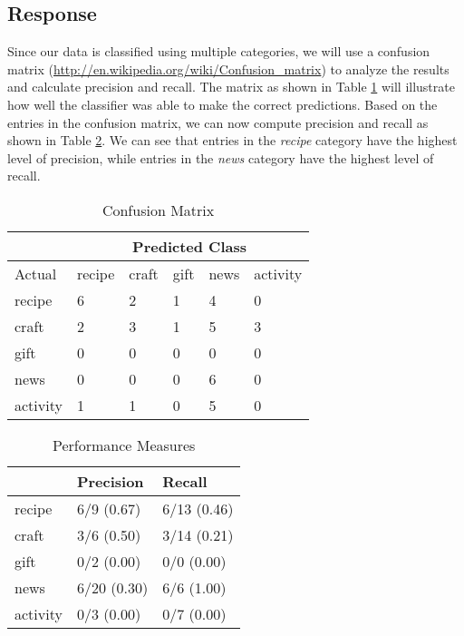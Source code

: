 \documentclass[letterpaper,11pt]{report}
\begin{document}
\begin{savenotes}
\subsection{Response}Since our data is classified using multiple categories, we will use a confusion matrix (\small\url{http://en.wikipedia.org/wiki/Confusion_matrix}) to analyze the results and calculate precision and recall. The matrix as shown in Table \ref{tab:confusion} will illustrate how well the classifier was able to make the correct predictions. Based on the entries in the confusion matrix, we can now compute precision and recall as shown in Table \ref{tab:performance}. We can see that entries in the \emph{recipe} category have the highest level of precision, while entries in the \emph{news} category have the highest level of recall.

\begin{table}[htbp]
\centering
    \begin{tabular}{|p{4cm}|l|l|l|l|l|}
    \hline
						 & \multicolumn{5}{|c|}{Predicted Class} \\ \hline
    Actual   & recipe & craft & gift & news & activity \\ \hline
    recipe   & 6      & 2     & 1    & 4    & 0       \\ \hline
    craft    & 2      & 3     & 1    & 5    & 3       \\ \hline
    gift     & 0      & 0     & 0    & 0    & 0       \\ \hline
    news     & 0      & 0     & 0    & 6    & 0       \\ \hline
    activity & 1      & 1     & 0    & 5    & 0       \\ \hline
    \end{tabular}
    \caption {Confusion Matrix}
			\label{tab:confusion}
\end{table}

\begin{table}[htbp]
\centering
    \begin{tabular}{|p{4cm}|l|l|}
    \hline
    ~        & Precision & Recall \\ \hline
    recipe   & 6/9   (0.67)  & 6/13 (0.46)  \\ \hline
    craft    & 3/6   (0.50)  & 3/14 (0.21)  \\ \hline
    gift     & 0/2   (0.00)  & 0/0  (0.00)  \\ \hline
    news     & 6/20 (0.30)  & 6/6  (1.00)  \\ \hline
    activity & 0/3   (0.00)  & 0/7  (0.00)  \\ \hline
    \end{tabular}
    \caption {Performance Measures}
		\label{tab:performance}
\end{table}

\end{savenotes}
\end{document}

